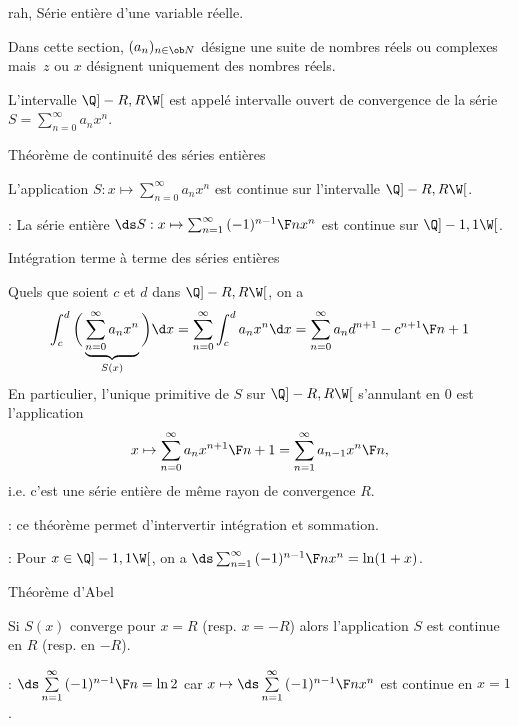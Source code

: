 %

%

%

%


\Subsection rah, S\'erie enti\`ere d'une variable r\'eelle. 

Dans cette section, $(a_n)_{n\in\ob N}$ d\'esigne une suite de nombres r\'eels ou complexes 
mais~$z$ ou $x$ d\'esignent uniquement des nombres r\'eels. 
\bigskip

\Definition [$\sum_{n=0}^\infty a_nx^n$ de rayon de convergence~$R>0$] 
L'intervalle $\Q]-R,R\W[$ est appel\'e intervalle ouvert de convergence de la s\'erie $S=\sum_{n=0}^\infty a_nx^n$. 

\Concept Th\'eor\`eme de continuit\'e des s\'eries enti\`eres

\Theoreme [$\sum_{n=0}^\infty a_n x^n$ de rayon de convergence $R>0$ ou~${R=\infty}$] 
L'application $S:x\mapsto\sum_{n=0}^\infty a_nx^n$ est continue sur l'intervalle $\Q]-R,R\W[$. 

\Application : La s\'erie enti\`ere $\ds S:x\mapsto\sum_{n=1}^{\infty}{(-1)^{n-1}\F n}x^n$ est continue sur $\Q]-1,1\W[$. 

\Concept Int\'egration terme \`a terme des s\'eries enti\`eres

\Theoreme [$S=$ de rayon de convergence $R>0$ ou~$R=\infty$] 
Quels que soient $c$ et $d$ dans $\Q]-R,R\W[$, on a 
$$
\int_c^d\bigg(\underbrace{\sum\limits_{n=0}^\infty a_n x^n}_{S(x)}\bigg)\d x=\sum\limits_{n=0}^\infty\int_c^da_n x^n\d x=\sum\limits_{n=0}^\infty a_n{d^{n+1}-c^{n+1}\F n+1}
$$
En particulier, l'unique primitive de $S$ sur $\Q]-R,R\W[$ s'annulant en $0$ est l'application 
$$
x\mapsto\sum_{n=0}^\infty a_n{x^{n+1}\F n+1}=\sum_{n=1}^\infty a_{n-1}{x^n\F n}, 
$$
i.e. c'est une s\'erie enti\`ere de m\^eme rayon de convergence $R$. 

\Remarque : ce th\'eor\`eme permet d'intervertir int\'egration et sommation. 

\Application : Pour $x\in\Q]-1,1\W[$, on a $\ds \sum_{n=1}^\infty{(-1)^{n-1}\F n}x^n=\ln(1+x)$. 

\Concept Th\'eor\`eme d'Abel

\Theoreme [$S=\sum_{n=0}^\infty a_n x^n$ de rayon de convergence $R>0$] 
Si $S(x)$ converge pour $x=R$ (resp. $x=-R$) alors l'application $S$ est continue en $R$ (resp. en $-R$). 

\Application : $\ds\sum\limits_{n=1}^{\infty}{(-1)^{n-1}\F n}=\ln 2$ car $x\mapsto\ds \sum\limits_{n=1}^\infty{(-1)^{n-1}\F n}x^n$ est continue en $x=1$. 

